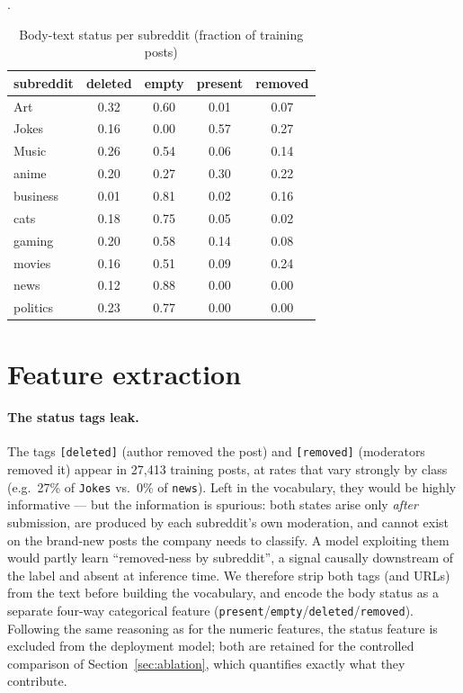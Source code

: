 \documentclass[11pt,a4paper]{article}
\begin{document}
\begin{table}[htbp]\centering\small
\label{tab:body-subreddit}
\caption{Body-text status per subreddit (fraction of training posts)}.\begin{tabular}{lcccc}\toprule
subreddit & deleted & empty & present & removed\\\midrule
Art & 0.32 & 0.60 & 0.01 & 0.07\\
Jokes & 0.16 & 0.00 & 0.57 & 0.27\\
Music & 0.26 & 0.54 & 0.06 & 0.14\\
anime & 0.20 & 0.27 & 0.30 & 0.22\\
business & 0.01 & 0.81 & 0.02 & 0.16\\
cats & 0.18 & 0.75 & 0.05 & 0.02\\
gaming & 0.20 & 0.58 & 0.14 & 0.08\\
movies & 0.16 & 0.51 & 0.09 & 0.24\\
news & 0.12 & 0.88 & 0.00 & 0.00\\
politics & 0.23 & 0.77 & 0.00 & 0.00\\\bottomrule
\end{tabular}
\end{table}

\section{Feature extraction}
\label{sec:extraction}

\paragraph{The status tags leak.}
The tags \texttt{[deleted]} (author removed the post) and \texttt{[removed]}
(moderators removed it) appear in 27{,}413 training posts, at rates that vary
strongly by class (e.g.\ 27\% of \texttt{Jokes} vs.\ 0\% of \texttt{news}).
Left in the vocabulary, they would be highly informative --- but the
information is spurious: both states arise only \emph{after} submission, are
produced by each subreddit's own moderation, and cannot exist on the
brand-new posts the company needs to classify. A model exploiting them would
partly learn ``removed-ness by subreddit'', a signal causally downstream of
the label and absent at inference time. We therefore strip both tags (and
URLs) from the text before building the vocabulary, and encode the body
status as a separate four-way categorical feature
(\texttt{present}/\texttt{empty}/\texttt{deleted}/\texttt{removed}). Following
the same reasoning as for the numeric features, the status feature is
excluded from the deployment model; both are retained for the controlled
comparison of Section~\ref{sec:ablation}, which quantifies exactly what they
contribute.
\end{document}
